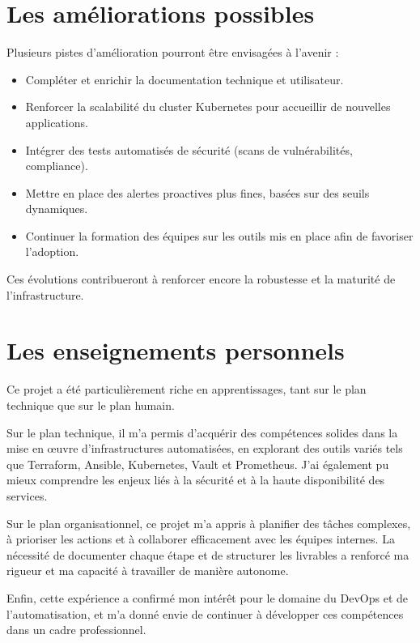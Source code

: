 \section{Les améliorations possibles}

Plusieurs pistes d’amélioration pourront être envisagées à l’avenir :

\begin{itemize}
	\item Compléter et enrichir la documentation technique et utilisateur.
	\item Renforcer la scalabilité du cluster Kubernetes pour accueillir de nouvelles applications.
	\item Intégrer des tests automatisés de sécurité (scans de vulnérabilités, compliance).
	\item Mettre en place des alertes proactives plus fines, basées sur des seuils dynamiques.
	\item Continuer la formation des équipes sur les outils mis en place afin de favoriser l’adoption.
\end{itemize}

Ces évolutions contribueront à renforcer encore la robustesse et la maturité de l’infrastructure.

\section{Les enseignements personnels}

Ce projet a été particulièrement riche en apprentissages, tant sur le plan technique que sur le plan humain.

Sur le plan technique, il m’a permis d’acquérir des compétences solides dans la mise en œuvre d’infrastructures automatisées, en explorant des outils variés tels que Terraform, Ansible, Kubernetes, Vault et Prometheus. J’ai également pu mieux comprendre les enjeux liés à la sécurité et à la haute disponibilité des services.

Sur le plan organisationnel, ce projet m’a appris à planifier des tâches complexes, à prioriser les actions et à collaborer efficacement avec les équipes internes. La nécessité de documenter chaque étape et de structurer les livrables a renforcé ma rigueur et ma capacité à travailler de manière autonome.

Enfin, cette expérience a confirmé mon intérêt pour le domaine du DevOps et de l’automatisation, et m’a donné envie de continuer à développer ces compétences dans un cadre professionnel.

